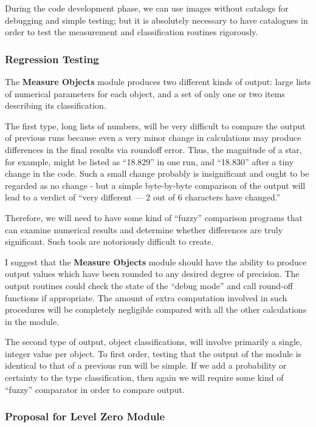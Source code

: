   During the code development phase, we can use images
without catalogs for debugging and simple testing; but it is
absolutely necessary to have catalogues in order to test the
measurement and classification routines rigorously.  

\subsubsection {Regression Testing}

  The {\bf Measure Objects} module produces two
different kinds of output: large lists of numerical parameters
for each object, and a set of only one or two items describing
its classification.  

  The first type, long lists of numbers, will be very 
difficult to compare the output of previous runs because
even a very minor change in calculations may produce
differences in the final results via roundoff error.
Thus, the magnitude of a star, for example, might be listed
as ``18.829'' in one run, and ``18.830'' after a tiny change
in the code.  Such a small change probably is insignificant
and ought to be regarded as no change - but a simple 
byte-by-byte comparison of the output will lead to a verdict
of ``very different --- 2 out of 6 characters have changed.''

  Therefore, we will need to have some kind of ``fuzzy''
comparison programs that can examine numerical results and
determine whether differences are truly significant.  Such tools
are notoriously difficult to create.

  I suggest that the {\bf Measure Objects} module should have
the ability to produce output values which have been rounded
to any desired degree of precision.  
The output routines could check the state of the ``debug mode''
and call round-off functions if appropriate.  
The amount of extra computation involved in such procedures 
will be completely negligible compared with all the other
calculations in the module.

  The second type of output, object classifications, will 
involve primarily a single, integer value per object.
To first order, testing that the output of the module is identical
to that of a previous run will be simple.  If we add a
probability or certainty to the type classification, then again
we will require some kind of ``fuzzy'' comparator in order
to compare output.

\subsubsection {Proposal for Level Zero Module}

